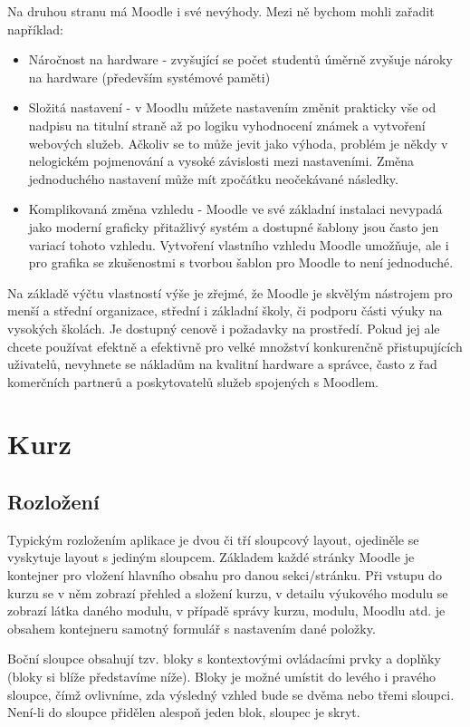 \documentclass[
print,
  11pt,
  table,   
  nolof,    
  nolot,
  oneside,
  draft
]{fithesis3}
\begin{document}
Na druhou stranu má Moodle i své nevýhody. Mezi ně bychom mohli zařadit například:
\begin{itemize}
\item Náročnost na hardware - zvyšující se počet studentů úměrně zvyšuje nároky na hardware (především systémové paměti)
\item Složitá nastavení - v Moodlu můžete nastavením změnit prakticky vše od nadpisu na titulní straně až po logiku vyhodnocení známek a vytvoření webových služeb. Ačkoliv se to může jevit jako výhoda, problém je někdy v nelogickém pojmenování a vysoké závislosti mezi nastaveními. Změna jednoduchého nastavení může mít zpočátku neočekávané následky.
\item Komplikovaná změna vzhledu - Moodle ve své základní instalaci nevypadá jako moderní graficky přitažlivý systém a dostupné šablony jsou často jen variací tohoto vzhledu. Vytvoření vlastního vzhledu Moodle umožňuje, ale i pro grafika se zkušenostmi s tvorbou šablon pro Moodle to není jednoduché.
\end{itemize}

Na základě výčtu vlastností výše je zřejmé, že Moodle je skvělým nástrojem pro menší a střední organizace, střední i základní školy, či podporu části výuky na vysokých školách. Je dostupný cenově i požadavky na prostředí. Pokud jej ale chcete používat efektně a efektivně pro velké množství konkurenčně přistupujících uživatelů, nevyhnete se nákladům na kvalitní hardware a správce, často z řad komerčních partnerů a poskytovatelů služeb spojených s Moodlem. 

	\section{Kurz}
		\subsection{Rozložení}
Typickým rozložením aplikace je dvou či tří sloupcový layout, ojediněle se vyskytuje layout s jediným sloupcem. Základem každé stránky Moodle je kontejner pro vložení hlavního obsahu pro danou sekci/stránku. Při vstupu do kurzu se v něm zobrazí přehled a složení kurzu, v detailu výukového modulu se zobrazí látka daného modulu, v případě správy kurzu, modulu, Moodlu atd. je obsahem kontejneru samotný formulář s nastavením dané položky.

Boční sloupce obsahují tzv. bloky s kontextovými ovládacími prvky a doplňky (bloky si blíže představíme níže). Bloky je možné umístit do levého i pravého sloupce, čímž ovlivníme, zda výsledný vzhled bude se dvěma nebo třemi sloupci. Není-li do sloupce přidělen alespoň jeden blok, sloupec je skryt. 
\end{document}
